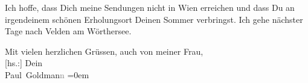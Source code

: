 \pstart
           Ich hoffe, dass Dich meine Sendungen nicht in Wien
               erreichen und dass Du an irgendeinem schönen Erholungsort Deinen Sommer verbringst.
               Ich gehe nächster Tage nach Velden am
               Wörthersee.\pend
           
\pstart
           Mit vielen herzlichen Grüssen, auch von meiner Frau, {\\[\baselineskip]}{[}hs.:{]} Dein {\\[\baselineskip]}\spacefill\mbox{Paul Goldman\textcolor{gray}{n}}\pend
           \leftskip=0em{}\endnumbering{}  \newcommand{\dateiname}{L03518}\newcommand{\titel}{Paul Goldmann an Arthur Schnitzler, 2. 8. 1931}\newcommand{\editorInnen}{Martin Anton Müller und Laura Untner}
